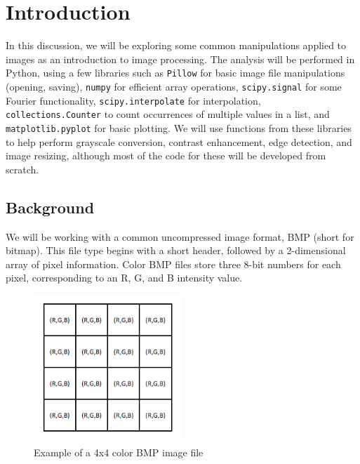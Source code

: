 \documentclass[11pt,a4paper]{article}
\begin{document}
\pagebreak

\tableofcontents

\pagebreak

\section{Introduction}
In this discussion, we will be exploring some common manipulations applied to images as an introduction to image processing. The analysis will be performed in Python, using a few libraries such as \verb|Pillow| for basic image file manipulations (opening, saving), \verb|numpy| for efficient array operations, \verb|scipy.signal| for some Fourier functionality, \verb|scipy.interpolate| for interpolation, \\ \verb|collections.Counter| to count occurrences of multiple values in a list, and \verb|matplotlib.pyplot| for basic plotting. We will use functions from these libraries to help perform grayscale conversion, contrast enhancement, edge detection, and image resizing, although most of the code for these will be developed from scratch.


\subsection{Background}
We will be working with a common uncompressed image format, BMP (short for bitmap). This file type begins with a short header, followed by a 2-dimensional array of pixel information. Color BMP files store three 8-bit numbers for each pixel, corresponding to an R, G, and B intensity value.

\begin{figure}
	\centering
	\includegraphics[width=0.5\textwidth]{figs/rgb_example}
	\caption{Example of a 4x4 color BMP image file}
	\label{fig:rgb_example}
\end{figure}
\end{document}
